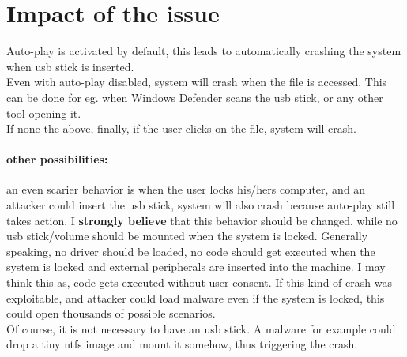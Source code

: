 \documentclass[12pt]{article}
\begin{document}
\section{Impact of the issue}
Auto-play is activated by default, this leads to automatically crashing the system when usb stick is inserted.\\
Even with auto-play disabled, system will crash when the file is accessed. This can be done for eg. when Windows Defender scans the usb stick, or any other tool opening it.\\ If none the above, finally, if the user clicks on the file, system will crash.\\

\paragraph{other possibilities:}
an even scarier behavior is when the user locks his/hers computer, and an attacker could insert the usb stick, system will also crash because auto-play still takes action. I \textbf{strongly believe} that this behavior should be changed, while no usb stick/volume should be mounted when the system is locked. Generally speaking, no driver should be loaded, no code should get executed when the system is locked and external peripherals are inserted into the machine. I may think this as, code gets executed without user consent. If this kind of crash was exploitable, and attacker could load malware even if the system is locked, this could open thousands of possible scenarios. \\
Of course, it is not necessary to have an usb stick. A malware for example could drop a tiny ntfs image and mount it somehow, thus triggering the crash.
\end{document}
